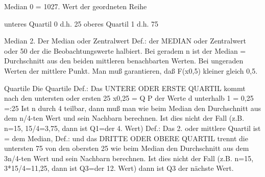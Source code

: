 Median	0	 = 1027. Wert der geordneten Reihe			
					
unteres Quartil	0	d.h.  25%
oberes Quartil	1	d.h.  75%




Median
2. Der Median oder Zentralwert
Def.: der MEDIAN oder Zentralwert oder 50%
der die Beobachtungswerte halbiert. Bei geradem n ist der Median =
Durchschnitt aus den beiden mittleren benachbarten Werten. Bei ungeraden
Werten der mittlere Punkt. Man muß garantieren, daß F(x0,5) kleiner gleich 0,5.
 
Quartile
Die Quartile
Def.: Das UNTERE ODER ERSTE QUARTIL kommt nach den untersten oder ersten
25%
x0,25 = Q P der Werte d unterhalb 1 = 0,25 =:25%
Ist n durch 4 teilbar, dann muß man wie beim Median den Durchschnitt aus
dem n/4-ten Wert und sein Nachbarn berechnen. Ist dies nicht der Fall (z.B.
n=15, 15/4=3,75, dann ist Q1=der 4. Wert)
Def.: Das 2. oder mittlere Quartil ist = dem Median,
Def.: und das DRITTE ODER OBERE QUARTIL trennt die untersten 75%
von den obersten 25%
wie beim Median den Durchschnitt aus dem 3n/4-ten Wert und sein Nachbarn
berechnen. Ist dies nicht der Fall (z.B. n=15, 3*15/4=11,25, dann ist Q3=der
12. Wert) dann ist Q3 der nächste Wert.